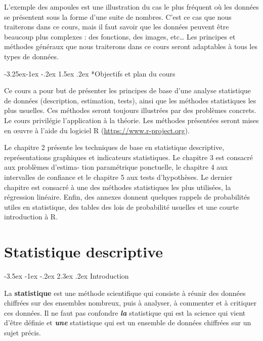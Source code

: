 \documentclass[]{book}
\makeatletter
\renewcommand\section{\@startsection {section}{1}{\z@}%
                                   {-3.5ex \@plus -1ex \@minus -.2ex}%
                                   {2.3ex \@plus.2ex}%
                                   {\normalfont\Large\bfseries\color{ForestGreen}}}
\renewcommand\subsection{\@startsection{subsection}{2}{\z@}%
                                     {-3.25ex\@plus -1ex \@minus -.2ex}%
                                     {1.5ex \@plus .2ex}%
                                     {\normalfont\large\bfseries\color{Violet}}}
\theoremstyle{magentacolor}
\theoremstyle{proprie}
\theoremstyle{exstyle}
\theoremstyle{exostyle}
\theoremstyle{definition}
\theoremstyle{definition}
\theoremstyle{definition}
\theoremstyle{remark}
\makeatother
\begin{document}
L'exemple des ampoules est une illustration du cas le plus fréquent où les données se
présentent sous la forme d'une suite de nombres. C'est ce cas que nous traiterons dans
ce cours, mais il faut savoir que les données peuvent être beaucoup plus complexes : des fonctions, des images, etc\ldots{} Les principes et méthodes généraux que nous traiterons dans
ce cours seront adaptables à tous les types de données.

\hypertarget{objectifs-et-plan-du-cours}{%
\subsection*{Objectifs et plan du cours}\label{objectifs-et-plan-du-cours}}

Ce cours a pour but de présenter les principes de base d'une analyse statistique
de données (description, estimation, tests), ainsi que les méthodes statistiques les plus
usuelles. Ces méthodes seront toujours illustrées par des problèmes concrets. Le cours privilégie l'application à la
théorie. Les méthodes présentées seront mises en œuvre à l'aide du logiciel R (\url{https://www.r-project.org}).

{Le chapitre 2 présente les techniques de base en statistique descriptive, représentations
graphiques et indicateurs statistiques. Le chapitre 3 est consacré aux problèmes d'estima-
tion paramétrique ponctuelle, le chapitre 4 aux intervalles de confiance et le chapitre 5
aux tests d'hypothèses. Le dernier chapitre est consacré à une des méthodes statistiques
les plus utilisées, la régression linéaire. Enfin, des annexes donnent quelques rappels de
probabilités utiles en statistique, des tables des lois de probabilité usuelles et une courte
introduction à R.}

\hypertarget{statistique-descriptive}{%
\chapter{Statistique descriptive}\label{statistique-descriptive}}

\hypertarget{introduction-2}{%
\section{Introduction}\label{introduction-2}}

La \textbf{statistique} est une méthode scientifique qui consiste à réunir des données chiffrées sur des ensembles nombreux, puis à analyser, à commenter et à critiquer ces données. Il ne faut pas
confondre \textbf{\emph{la}} statistique qui est la science qui vient d'être définie et \textbf{\emph{une}} statistique qui est un
ensemble de données chiffrées sur un sujet précis.
\end{document}
